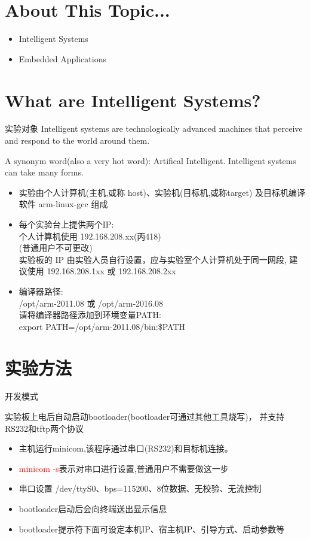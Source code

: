 \chapter{About This Topic...}{}
\begin{itemize}
    \item Intelligent Systems
    \item Embedded Applications
\end{itemize}
\endslide

\chapter{What are Intelligent Systems?}{实验对象}
Intelligent systems are technologically advanced machines
that perceive and respond to the world around them.

A synonym word(also a very hot word): Artifical Intelligent.
Intelligent systems can take many forms.
\endslide

\begin{itemize}
  \item 实验由个人计算机(主机,或称 host)、实验机(目标机,或称target)
		及目标机编译软件 arm-linux-gcc 组成
  \item 每个实验台上提供两个IP:\\
        个人计算机使用 192.168.208.xx(丙418)\\
		(普通用户不可更改)\\
		实验板的 IP 由实验人员自行设置，应与实验室个人计算机处于同一网段,
        建议使用 192.168.208.1xx 或 192.168.208.2xx
  \item 编译器路径:\\
        /opt/arm-2011.08 或 /opt/arm-2016.08\\
		请将编译器路径添加到环境变量PATH:\\
		export PATH=/opt/arm-2011.08/bin:\$PATH
\end{itemize}
\endslide

\chapter{实验方法}{开发模式}
\endslide

实验板上电后自动启动bootloader(bootloader可通过其他工具烧写)，
并支持RS232和tftp两个协议
\begin{itemize}
  \item 主机运行minicom,该程序通过串口(RS232)和目标机连接。
  \item \textcolor{red}{minicom -s}表示对串口进行设置,普通用户不需要做这一步
  \item 串口设置 /dev/ttyS0、bps=115200、8位数据、无校验、无流控制
  \item bootloader启动后会向终端送出显示信息
  \item bootloader提示符下面可设定本机IP、宿主机IP、引导方式、启动参数等
\end{itemize}
\endslide

